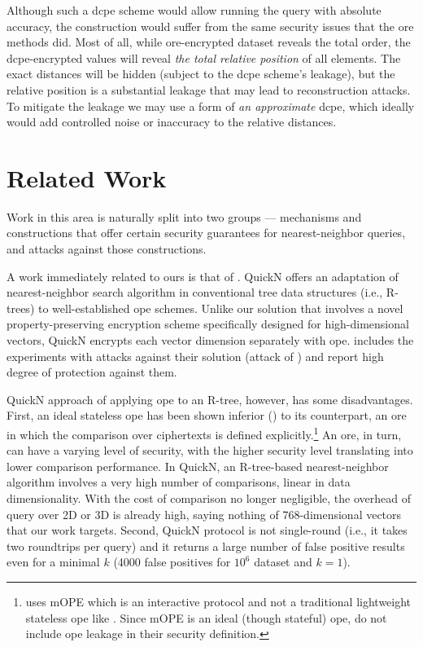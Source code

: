 		Although such a \acrfull{dcpe} scheme would allow running the query with absolute accuracy, the construction would suffer from the same security issues that the \acrshort{ore} methods did.
		Most of all, while \acrshort{ore}-encrypted dataset reveals the total order, the \acrshort{dcpe}-encrypted values will reveal \emph{the total relative position} of all elements.
		The exact distances will be hidden (subject to the \acrshort{dcpe} scheme's leakage), but the relative position is a substantial leakage that may lead to reconstruction attacks.
		To mitigate the leakage we may use a form of \emph{an approximate} \acrshort{dcpe}, which ideally would add controlled noise or inaccuracy to the relative distances.

	\section{Related Work}

		Work in this area is naturally split into two groups --- mechanisms and constructions that offer certain security guarantees for nearest-neighbor queries, and attacks against those constructions.

		A work immediately related to ours is that of \textcite{quick-n}.
		QuickN offers an adaptation of nearest-neighbor search algorithm in conventional tree data structures (i.e., R-trees) to well-established \acrfull{ope} schemes.
		Unlike our solution that involves a novel property-preserving encryption scheme specifically designed for high-dimensional vectors, QuickN encrypts each vector dimension separately with \acrshort{ope}.
		\cite{quick-n} includes the experiments with attacks against their solution (attack of \textcite{leakage-abuse-grubs-2017}) and report high degree of protection against them.

		QuickN approach of applying \acrshort{ope} to an R-tree, however, has some disadvantages.
		First, an ideal stateless \acrshort{ope} has been shown inferior (\cite{ope-leakage}) to its counterpart, an \acrfull{ore} in which the comparison over ciphertexts is defined explicitly.\footnote{
			\cite{quick-n} uses mOPE \cite{ope-ideal-security-protocol} which is an interactive protocol and not a traditional lightweight stateless \acrshort{ope} like \cite{bclo-ope}.
			Since mOPE is an ideal (though stateful) \acrshort{ope}, \cite{quick-n} do not include \acrshort{ope} leakage in their security definition.
		}
		An \acrshort{ore}, in turn, can have a varying level of security, with the higher security level translating into lower comparison performance.
		In QuickN, an R-tree-based nearest-neighbor algorithm involves a very high number of comparisons, linear in data dimensionality.
		With the cost of comparison no longer negligible, the overhead of query over 2D or 3D is already high, saying nothing of 768-dimensional vectors that our work targets.
		Second, QuickN protocol is not single-round (i.e., it takes two roundtrips per query) and it returns a large number of false positive results even for a minimal $k$ (\num{4000} false positives for $10^6$ dataset and $k = 1$).

